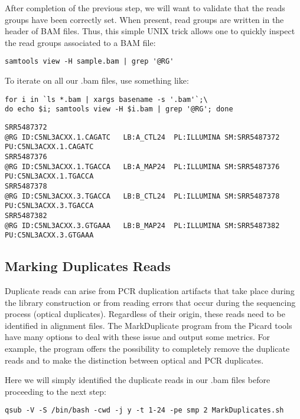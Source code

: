 After completion of the previous step, we will want to validate that the reads groups have been correctly set. When present, read groups are written in the header of BAM files. Thus, this simple UNIX trick allows one to quickly inspect the read groups associated to a BAM file:

\begin{verbatim}
samtools view -H sample.bam | grep '@RG'	
\end{verbatim}


To iterate on all our .bam files, use something like:

\begin{verbatim}
for i in `ls *.bam | xargs basename -s '.bam'`;\
do echo $i; samtools view -H $i.bam | grep '@RG'; done
\end{verbatim}

\begin{verbatim}
SRR5487372
@RG	ID:C5NL3ACXX.1.CAGATC	LB:A_CTL24	PL:ILLUMINA	SM:SRR5487372	PU:C5NL3ACXX.1.CAGATC
SRR5487376
@RG	ID:C5NL3ACXX.1.TGACCA	LB:A_MAP24	PL:ILLUMINA	SM:SRR5487376	PU:C5NL3ACXX.1.TGACCA
SRR5487378
@RG	ID:C5NL3ACXX.3.TGACCA	LB:B_CTL24	PL:ILLUMINA	SM:SRR5487378	PU:C5NL3ACXX.3.TGACCA
SRR5487382
@RG	ID:C5NL3ACXX.3.GTGAAA	LB:B_MAP24	PL:ILLUMINA	SM:SRR5487382	PU:C5NL3ACXX.3.GTGAAA
\end{verbatim}





\subsection{Marking Duplicates Reads}


Duplicate reads can arise from PCR duplication artifacts that take place during the library construction or from reading errors that occur during the sequencing process (optical duplicates). Regardless of their origin, these reads need to be identified in alignment files. The MarkDuplicate program from the Picard tools have many options to deal with these issue and output some metrics. For example, the program offers the possibility to completely remove the duplicate reads and to make the distinction between optical and PCR duplicates.

Here we will simply identified the duplicate reads in our .bam files before proceeding to the next step:

\begin{verbatim}
qsub -V -S /bin/bash -cwd -j y -t 1-24 -pe smp 2 MarkDuplicates.sh
\end{verbatim}


